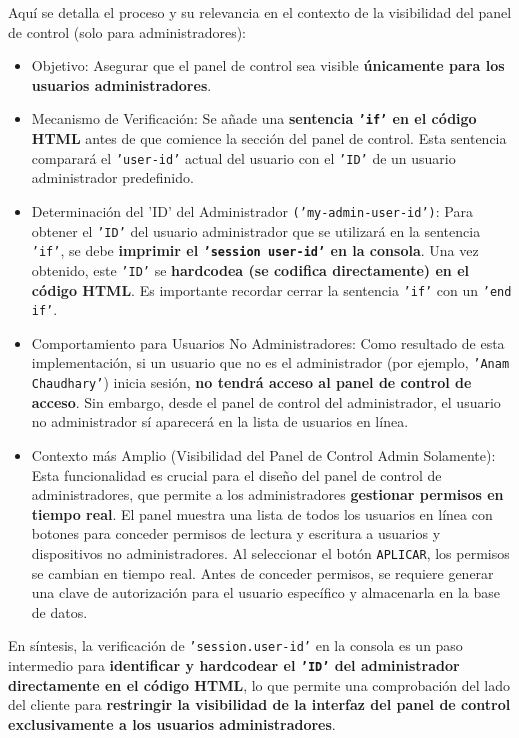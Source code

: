 \documentclass{report}
\begin{document}
Aquí se detalla el proceso y su relevancia en el contexto de la visibilidad del panel de control (solo para administradores):
\begin{itemize}
    \item Objetivo: Asegurar que el panel de control sea visible \textbf{únicamente para los usuarios administradores}.
    \item Mecanismo de Verificación: Se añade una \textbf{sentencia \texttt{'if'} en el código HTML} antes de que comience la sección del panel de control. 
          Esta sentencia comparará el \texttt{'user-id'} actual del usuario con el \texttt{'ID'} de un usuario administrador predefinido.
    \item Determinación del 'ID' del Administrador \texttt{('my-admin-user-id')}: Para obtener el \texttt{'ID'} del usuario administrador que se utilizará 
          en la sentencia \texttt{'if'}, se debe \textbf{imprimir el \texttt{'session user-id'} en la consola}. Una vez obtenido, este \texttt{'ID'} se
          \textbf{hardcodea (se codifica directamente) en el código HTML}. Es importante recordar cerrar la sentencia \texttt{'if'} con un \texttt{'end if'}.
    \item Comportamiento para Usuarios No Administradores: Como resultado de esta implementación, si un usuario que no es el administrador (por ejemplo, 
          \texttt{'Anam Chaudhary'}) inicia sesión, \textbf{no tendrá acceso al panel de control de acceso}. Sin embargo, desde el panel de control del 
          administrador, el usuario no administrador sí aparecerá en la lista de usuarios en línea.
    \item Contexto más Amplio (Visibilidad del Panel de Control Admin Solamente): Esta funcionalidad es crucial para el diseño del panel de control de 
          administradores, que permite a los administradores \textbf{gestionar permisos en tiempo real}. El panel muestra una lista de todos los usuarios 
          en línea con botones para conceder permisos de lectura y escritura a usuarios y dispositivos no administradores. Al seleccionar el botón 
          \texttt{APLICAR}, los permisos se cambian en tiempo real. Antes de conceder permisos, se requiere generar una clave de autorización para el 
          usuario específico y almacenarla en la base de datos.
\end{itemize}

En síntesis, la verificación de \texttt{'session.user-id'} en la consola es un paso intermedio para \textbf{identificar y hardcodear el \texttt{'ID'} 
del administrador directamente en el código HTML}, lo que permite una comprobación del lado del cliente para \textbf{restringir la visibilidad de la 
interfaz del panel de control exclusivamente a los usuarios administradores}.
\end{document}
